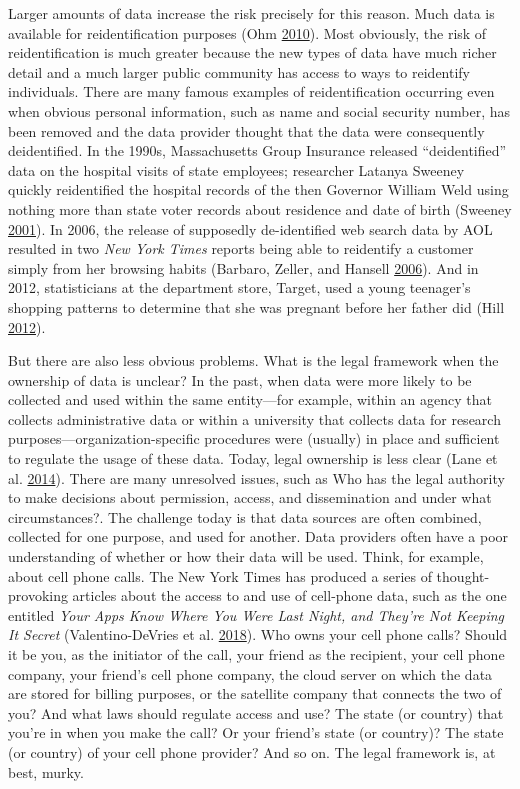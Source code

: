 \documentclass[]{krantz}
\begin{document}
Larger amounts of data increase the risk precisely for this reason. Much
data is available for reidentification purposes (Ohm
\protect\hyperlink{ref-ohm2010broken}{2010}). Most obviously, the risk
of reidentification is much greater because the new types of data have
much richer detail and a much larger public community has access to ways
to reidentify individuals. There are many famous examples of
reidentification occurring even when obvious personal information, such
as name and social security number, has been removed and the data
provider thought that the data were consequently deidentified. In the
1990s, Massachusetts Group Insurance released ``deidentified'' data on
the hospital visits of state employees; researcher Latanya Sweeney
quickly reidentified the hospital records of the then Governor William
Weld using nothing more than state voter records about residence and
date of birth (Sweeney
\protect\hyperlink{ref-sweeney2001computational}{2001}). In 2006, the
release of supposedly de-identified web search data by AOL resulted in
two \emph{New York Times} reports being able to reidentify a customer
simply from her browsing habits (Barbaro, Zeller, and Hansell
\protect\hyperlink{ref-barbaro2006face}{2006}). And in 2012,
statisticians at the department store, Target, used a young teenager's
shopping patterns to determine that she was pregnant before her father
did (Hill \protect\hyperlink{ref-hill2012target}{2012}).

But there are also less obvious problems. What is the legal framework
when the ownership of data is unclear? In the past, when data were more
likely to be collected and used within the same entity---for example,
within an agency that collects administrative data or within a
university that collects data for research
purposes---organization-specific procedures were (usually) in place and
sufficient to regulate the usage of these data. Today, legal ownership
is less clear (Lane et al. \protect\hyperlink{ref-lane2014}{2014}).
There are many unresolved issues, such as Who has the legal authority to
make decisions about permission, access, and dissemination and under
what circumstances?. The challenge today is that data sources are often
combined, collected for one purpose, and used for another. Data
providers often have a poor understanding of whether or how their data
will be used. Think, for example, about cell phone calls. The New York
Times has produced a series of thought-provoking articles about the
access to and use of cell-phone data, such as the one entitled
\emph{Your Apps Know Where You Were Last Night, and They're Not Keeping
It Secret} (Valentino-DeVries et al.
\protect\hyperlink{ref-Valentino-DeVries}{2018}). Who owns your cell
phone calls? Should it be you, as the initiator of the call, your friend
as the recipient, your cell phone company, your friend's cell phone
company, the cloud server on which the data are stored for billing
purposes, or the satellite company that connects the two of you? And
what laws should regulate access and use? The state (or country) that
you're in when you make the call? Or your friend's state (or country)?
The state (or country) of your cell phone provider? And so on. The legal
framework is, at best, murky.
\end{document}
